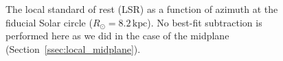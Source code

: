 \documentclass[twocolumn]{aastex62}
\newcommand{\kpc}{\text{kpc}}
\begin{document}
\begin{figure}
\caption{The local standard of rest (LSR) as a function of azimuth at the
fiducial Solar circle ($R_{\odot} = 8.2\,\kpc$). No best-fit subtraction is
performed here as we did in the case of the midplane
(Section~\ref{ssec:local_midplane}).}
\end{figure}


\end{document}
